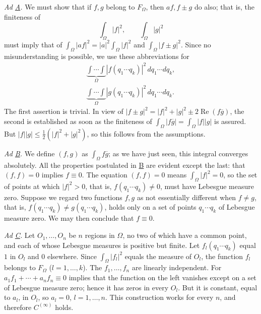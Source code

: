 \documentclass[fontsize=13pt,twoside,openany,headings=normal,parskip=false,bookmarkpackage=false,DIV=calc]{scrbook}
\begin{document}
\emph{Ad \hyperref[ax:II.A]{A}.} We must show that if $f,g$ belong to $F_\Omega$, then $af,f\pm g$ do also; that is, the finiteness of
\[
\int_\Omega|f|^2,\qquad\int_\Omega|g|^2
\]
must imply that of $\int_\Omega|af|^2=|a|^2\int_\Omega|f|^2$ and $\int_\Omega|f\pm g|^2$. Since no misunderstanding is possible, we use these abbreviations for
\begin{gather*}
\underbrace{\int\cdots\int}_{\Omega}|f(q_1\cdots q_k)|^2\,dq_1\cdots dq_k,\\
\underbrace{\int\cdots\int}_{\Omega}|g(q_1\cdots q_k)|^2\,dq_1\cdots dq_k.
\end{gather*}
The first assertion is trivial. In view of $|f\pm g|^2=|f|^2+|g|^2\pm2\operatorname{Re}(f\overline g)$, the second is established as soon as the finiteness of $\int_\Omega|f\overline g|=\int_\Omega|f||g|$ is assured. But $|f||g|\leq\frac12(|f|^2+|g|^2)$, so this follows from the assumptions.

\emph{Ad \hyperref[ax:II.B]{B}.} We define $(f,g)$ as $\int_\Omega f\overline g$; as we have just seen, this integral converges absolutely. All the properties postulated in \hyperref[ax:II.B]{B} are evident except the last: that $(f,f)=0$ implies $f\equiv0$. The equation $(f,f)=0$ means $\int_\Omega|f|^2=0$, so the set of points at which $|f|^2>0$, that is, $f(q_1\cdots q_k)\ne0$, must have Lebesgue measure zero. Suppose we regard two functions $f,g$ as not essentially different when $f\ne g$, that is, $f(q_1\cdots q_k)\ne g(q_1\cdots q_k)$, holds only on a set of points $q_1\cdots q_k$ of Lebesgue measure zero. We may then conclude that $f\equiv0$.

\emph{Ad \hyperref[ax:II.Cn]{C}.} Let $O_1,\ldots,O_n$ be $n$ regions in $\Omega$, no two of which have a common point, and each of whose Lebesgue measures is positive but finite. Let $f_l(q_1\cdots q_k)$ equal $1$ in $O_l$ and $0$ elsewhere. Since $\int_\Omega|f_l|^2$ equals the measure of $O_l$, the function $f_l$ belongs to $F_\Omega$ ($l=1,\ldots,k$). The $f_1,\ldots,f_n$ are linearly independent. For $a_1f_1+\cdots+a_nf_n\equiv0$ implies that the function on the left vanishes except on a set of Lebesgue measure zero; hence it has zeros in every $O_l$. But it is constant, equal to $a_l$, in $O_l$, so $a_l=0$, $l=1,\ldots,n$. This construction works for every $n$, and therefore \hyperref[ax:II.Cinfty]{$C^{(\infty)}$} holds.
\end{document}
